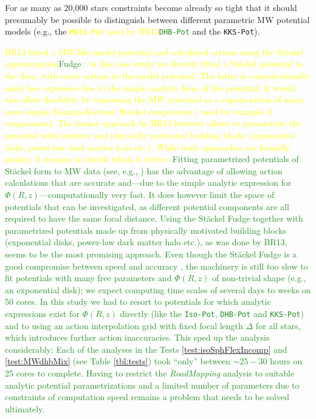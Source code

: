 \documentclass[iop,revtex4,numberedappendix,appendixfloats]{emulateapj}
\newcommand{\RM}{{\sl RoadMapping}}
\newcommand{\NEW}[1]{\textcolor{ForestGreen}{#1}}
\newcommand{\OLD}[1]{\textcolor{Yellow}{#1}}%
\begin{document}
For as many as 20,000 stars constraints become already so tight that it should presumably be possible to distinguish between different parametric MW potential models (e.g., the \OLD{\texttt{MW13-Pot} used by BR13}\NEW{\texttt{DHB-Pot}} and the \texttt{KKS-Pot}).

\OLD{BR13 fitted a MW-like model potential and calculated actions using the St\"{a}ckel \OLD{approximation}\NEW{Fudge} \citep{2012MNRAS.426.1324B}; in this case study we directly fitted a St\"{a}ckel potential to the data, with exact actions in the model potential. The latter is computationally much less expensive due to the simple analytic form of the potential. It would also allow flexibility by expressing the MW potential as a superposition of many more simple Kuzmin-Kutuzov St\"{a}ckel components (\citet{2003MNRAS.340..752F} used for example 3 components). The former approach by BR13 however allows to parametrize the potential with intuitive and physically motivated building blocks (exponential disks, power-law dark matter halo etc.). While both approaches are formally similar, it remains to decide which is better.}
\NEW{Fitting parametrized potentials of St\"{a}ckel form to MW data (see, e.g., \citealt{1994AA...287...43B,2003MNRAS.340..752F}) has the advantage of allowing action calculations that are accurate and---due to the simple analytic expression for $\Phi(R,z)$---computationally very fast. It does however limit the space of potentials that can be investigated, as different potential components are all required to have the same focal distance. Using the St\"{a}ckel Fudge \citep{2012MNRAS.426.1324B} together with parametrized potentials made up from physically motivated building blocks (exponential disks, power-law dark matter halo etc.), as was done by BR13, seems to be the most promising approach. Even though the St\"{a}ckel Fudge is a good compromise between speed and accuracy \citep{2015MNRAS.449.3479S}, the machinery is still too slow to fit potentials with many free parameters and $\Phi(R,z)$ of non-trivial shape (e.g., an exponential disk); we expect computing time scales of several days to weeks on 50 cores. In this study we had to resort to potentials for which analytic expressions exist for $\Phi(R,z)$ directly (like the \texttt{Iso-Pot}, \texttt{DHB-Pot} and \texttt{KKS-Pot}) and to using an action interpolation grid \citep{2012MNRAS.426.1324B,2015ApJS..216...29B} with fixed focal length $\Delta$ for all stars, which introduces further action inaccuracies. This sped up the analysis considerably: Each of the analyses in the Tests \ref{test:isoSphFlexIncomp} and \ref{test:MWdhbMix} (see Table \ref{tbl:tests}) took ``only'' between $\sim25-30$ hours on 25 cores to complete. Having to restrict the \RM{} analysis to suitable analytic potential parametrizations and a limited number of parameters due to constraints of computation speed remains a problem that needs to be solved ultimately.}\\
\end{document}

